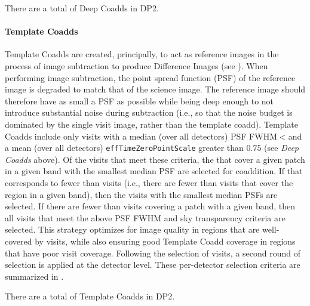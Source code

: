 There are a total of \ndeepcoadds Deep Coadds in \gls{DP2}.

\paragraph{Template Coadds}
Template Coadds are created, principally, to act as reference images in the process of image subtraction to produce Difference Images (see ).
When performing image subtraction, the point spread function (PSF) of the reference image is degraded to match that of the science image.
The reference image should therefore have as small a \gls{PSF} as possible while being deep enough to not introduce substantial noise during subtraction (i.e., so that the noise budget is dominated by the single visit image, rather than the template coadd).
Template Coadds include only visits with a  median (over all detectors) PSF FWHM$<$\templatecoaddselectionfwhm and a mean (over all detectors) \texttt{effTimeZeroPointScale} greater than $0.75$ (see \textit{Deep Coadds} above).
Of the visits that meet these criteria, the \templatecoaddfrac that cover a given patch in a given band with the smallest median PSF are selected for coaddition.
If that \templatecoaddfrac corresponds to fewer than \mintemplatecoaddvi visits (i.e., there are fewer than \minmultipletemplatecoaddvi visits that cover the region in a given band), then the \mintemplatecoaddvi visits with the smallest median PSFs are selected.
If there are fewer than \mintemplatecoaddvi visits covering a patch with a given band, then all visits that meet the above PSF FWHM and sky transparency criteria are selected.
This strategy optimizes for image quality in regions that are well-covered by visits, while also ensuring good Template Coadd coverage in regions that have poor visit coverage.
Following the selection of visits, a second round of selection is applied at the detector level.
These per-detector selection criteria are summarized in .

There are a total of \ntemplatecoadds Template Coadds in DP2.

